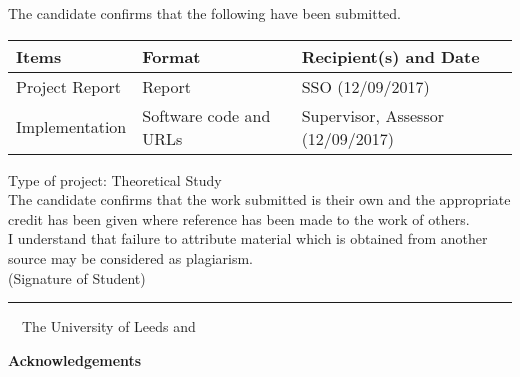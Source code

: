 \frontcover

\clearpage
\noindent The candidate confirms that the following have been submitted.\\
\begin{table}[ht!]
\begin{tabular}{|p{}|p{}|p{}|}
\hline
Items & Format & Recipient(s) and Date \\
\hline
Project Report & Report & SSO (12/09/2017) \\
\hline
Implementation & Software code and URLs & Supervisor, Assessor (12/09/2017) \\
\hline
\end{tabular}
\end{table}

\noindent Type of project: Theoretical Study
\vspace{\fill}\\
\noindent The candidate confirms that the work submitted is their own and the appropriate credit has been given where reference has been made to the work of others.
\vspace{\fill}\\
\noindent I understand that failure to attribute material which is obtained from another source may be considered as plagiarism.
\vspace{\fill}\\
\flushright(Signature of Student) \rule{50mm}{1pt}
\flushleft
\vspace{\fill}
\textcopyright~\session~The University of Leeds and~\fullname

\begin{dissertationsummary}

\end{dissertationsummary}

\clearpage
\centering\textbf{Acknowledgements}
\flushleft


\tableofcontents

\clearpage
\listoffigures

